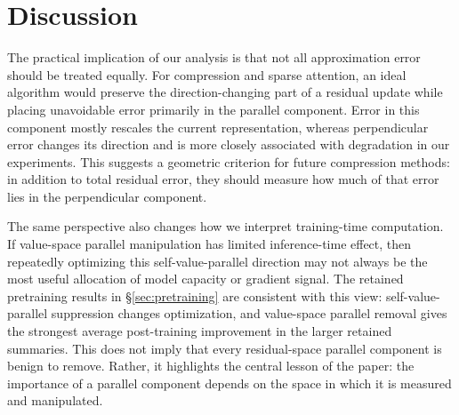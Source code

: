 \section{Discussion}
\label{sec:discussion}

The practical implication of our analysis is that not all approximation error
should be treated equally. For compression and sparse attention, an ideal
algorithm would preserve the direction-changing part of a residual update while
placing unavoidable error primarily in the parallel component. Error in this
component mostly rescales the current representation, whereas perpendicular
error changes its direction and is more closely associated with degradation in
our experiments. This suggests a geometric criterion for future compression
methods: in addition to total residual error, they should measure how much of
that error lies in the perpendicular component.

The same perspective also changes how we interpret training-time computation.
If value-space parallel manipulation has limited inference-time effect, then
repeatedly optimizing this self-value-parallel direction may not always be the
most useful allocation of model capacity or gradient signal. The retained
pretraining results in \S\ref{sec:pretraining} are consistent with this view:
self-value-parallel suppression changes optimization, and value-space parallel
removal gives the strongest average post-training improvement in the larger
retained summaries.
This does not imply that every residual-space parallel component is benign to
remove. Rather, it highlights the central lesson of the paper: the
importance of a parallel component depends on the space in which it is measured
and manipulated.
